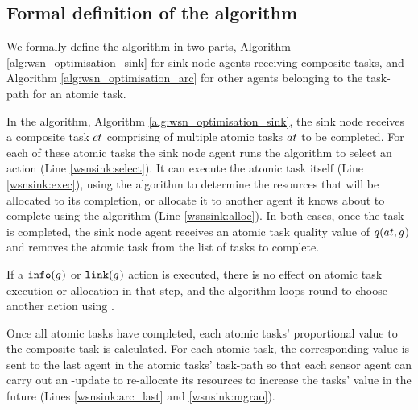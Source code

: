 \subsection{Formal definition of the \acronymWSNOptimisation{}{} algorithm}

We formally define the \acronymWSNOptimisation{}{} algorithm in two parts, Algorithm \ref{alg:wsn_optimisation_sink} for sink node agents receiving composite tasks, and Algorithm \ref{alg:wsn_optimisation_arc} for other agents belonging to the task-path for an atomic task.

In the \acronymWSNOptimisationSink{}{} algorithm, Algorithm \ref{alg:wsn_optimisation_sink}, the sink node receives a composite task $\varCompositeTask{}{}$ comprising of multiple atomic tasks $\varAtomicTask{}{}$ to be completed. For each of these atomic tasks the sink node agent runs the \acronymATARIA{}{} algorithm to select an action (Line \ref{wsnsink:select}). It can execute the atomic task itself (Line \ref{wsnsink:exec}), using the \acronymMGRAO{}{} algorithm to determine the resources that will be allocated to its completion, or allocate it to another agent it knows about to complete using the \acronymWSNOptimisationArc{}{} algorithm (Line \ref{wsnsink:alloc}). In both cases, once the task is completed, the sink node agent receives an atomic task quality value of $\functionAtomicTaskQualitySignature{}{}$ and removes the atomic task from the list of tasks to complete. 

If a $\functionInfo{}{}$ or $\functionLink{}{}$ action is executed, there is no effect on atomic task execution or allocation in that step, and the algorithm loops round to choose another action using \acronymATARIA{}{}.

Once all atomic tasks have completed, each atomic tasks' proportional value to the composite task is calculated. For each atomic task, the corresponding value is sent to the last agent in the atomic tasks' task-path so that each sensor agent can carry out an \acronymMGRAO{}{}-update to re-allocate its resources to increase the tasks' value in the future (Lines \ref{wsnsink:arc_last} and \ref{wsnsink:mgrao}). 

